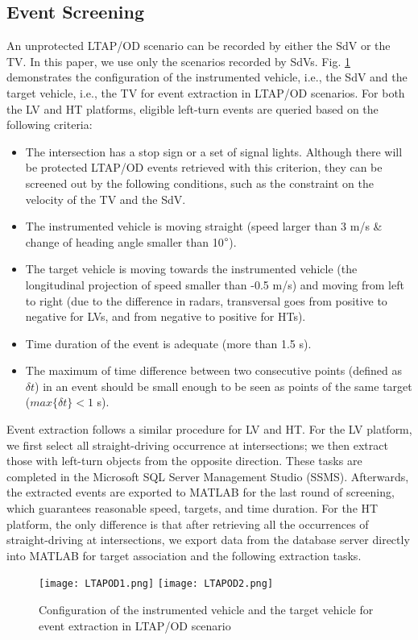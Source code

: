 \documentclass[letterpaper, 10 pt, conference]{ieeeconf}
\begin{document}
\subsection{Event Screening}
An unprotected LTAP/OD scenario can be recorded by either the SdV or the TV. In this paper, we use only the scenarios recorded by SdVs. Fig. \ref{fig:SDConflictLVHT} demonstrates the configuration of the instrumented vehicle, i.e., the SdV and the target vehicle, i.e., the TV for event extraction in LTAP/OD scenarios. For both the LV and HT platforms, eligible left-turn events are queried based on the following criteria:
\begin{itemize}
\item The intersection has a stop sign or a set of signal lights. Although there will be protected LTAP/OD events retrieved with this criterion, they can be screened out by the following conditions, such as the constraint on the velocity of the TV and the SdV. 
\item The instrumented vehicle is moving straight (speed larger than 3 m/s  \&  change of heading angle smaller than 10$\degree$).
\item The target vehicle is moving towards the instrumented vehicle (the longitudinal projection of speed smaller than -0.5 m/s) and moving from left to right (due to the difference in radars, transversal goes from positive to negative for LVs, and from negative to positive for HTs).
\item Time duration of the event is adequate (more than 1.5 s).
\item The maximum of time difference between two consecutive points (defined as $\delta t$) in an event should be small enough to be seen as points of the same target ($max\{\delta t\} < 1$ s).
\end{itemize}

Event extraction follows a similar procedure for LV and HT. For the LV platform, we first select all straight-driving occurrence at intersections; we then extract those with left-turn objects from the opposite direction. These tasks are completed in the Microsoft SQL Server Management Studio (SSMS). Afterwards, the extracted events are exported to MATLAB for the last round of screening, which guarantees reasonable speed, targets, and time duration. For the HT platform, the only difference is that after retrieving all the occurrences of straight-driving at intersections, we export data from the database server directly into MATLAB for target association and the following extraction tasks.
 \begin{figure}
   \texttt{[image: LTAPOD1.png]}\quad
   \texttt{[image: LTAPOD2.png]}
    \caption{Configuration of the instrumented vehicle and the target vehicle for event extraction in LTAP/OD scenario}
    \label{fig:SDConflictLVHT}

 \end{figure}
 
\end{document}
